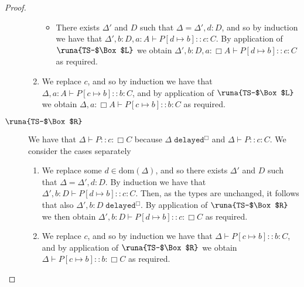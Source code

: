 \begin{lemma}
\begin{proof}
\begin{description}
\begin{enumerate}
\begin{itemize}
        \item There exists $\Delta'$ and $D$ such that $\Delta=\Delta',d:D$, and so by induction we have that $\Delta',b:D,a:A\vdash P[d\mapsto b] :: c\!:\!C$. By application of $\runa{TS-$\Box$L}$ we obtain $\Delta',b:D,a:\Box A\vdash P[d\mapsto b] :: c\!:\!C$ as required.
    \end{itemize}
    
    \item We replace $c$, and so by induction we have that $\Delta, a:A\vdash P[c\mapsto b] :: b\!:\!C$, and by application of $\runa{TS-$\Box$L}$ we obtain $\Delta,a:\Box A\vdash P[c\mapsto b] :: b\!:\!C$ as required.
\end{enumerate}


\item[$\runa{TS-$\Box$R}$] We have that $\Delta\vdash P :: c\!:\!\Box C$ because $\Delta\;\texttt{delayed}^\Box$ and $\Delta\vdash P :: c\!:\!C$. We consider the cases separately
\begin{enumerate}
    \item We replace some $d\in\text{dom}(\Delta)$, and so there exists $\Delta'$ and $D$ such that $\Delta=\Delta',d:D$. By induction we have that $\Delta',b:D\vdash P[d\mapsto b] :: c\!:\!C$. Then, as the types are unchanged, it follows that also $\Delta',b:D\;\texttt{delayed}^\Box$. By application of $\runa{TS-$\Box$R}$ we then obtain $\Delta',b:D\vdash P[d\mapsto b] :: c\!:\!\Box C$ as required.
    
    \item We replace $c$, and so by induction we have that $\Delta\vdash P[c\mapsto b] :: b\!:\!C$, and by application of $\runa{TS-$\Box$R}$ we obtain $\Delta\vdash P[c\mapsto b] :: b\!:\!\Box C$ as required.
\end{enumerate}


\end{description}
\end{proof}
\end{lemma}
